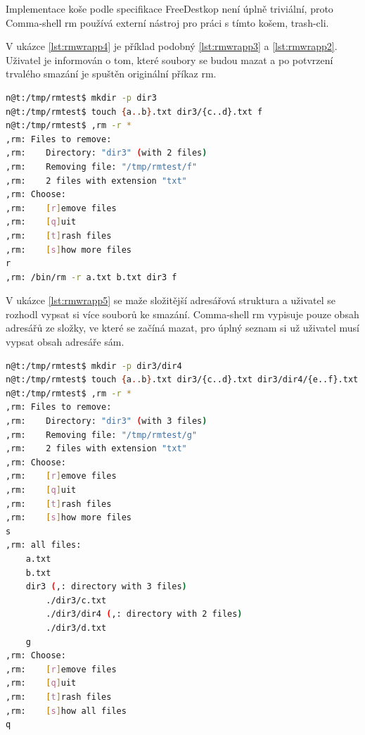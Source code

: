 \documentclass[thesis=M,czech]{FITthesis}[2012/06/26]
\begin{document}
Implementace koše podle specifikace FreeDestkop není úplně triviální, proto Comma-shell rm používá externí nástroj pro práci s tímto košem, trash-cli.


V ukázce \ref{lst:rmwrapp4} je příklad podobný \ref{lst:rmwrapp3} a \ref{lst:rmwrapp2}. Uživatel je informován o tom, které soubory se budou mazat a po potvrzení trvalého smazání je spuštěn originální příkaz rm.

\begin{minipage}{\linewidth}
\begin{lstlisting}[language=bash, caption={rm s }, label={lst:rmwrapp4}]
n@t:/tmp/rmtest$ mkdir -p dir3
n@t:/tmp/rmtest$ touch {a..b}.txt dir3/{c..d}.txt f
n@t:/tmp/rmtest$ ,rm -r *
,rm: Files to remove:
,rm:    Directory: "dir3" (with 2 files)
,rm:    Removing file: "/tmp/rmtest/f"
,rm:    2 files with extension "txt"
,rm: Choose:
,rm:    [r]emove files
,rm:    [q]uit
,rm:    [t]rash files
,rm:    [s]how more files
r
,rm: /bin/rm -r a.txt b.txt dir3 f
\end{lstlisting}
\end{minipage}


V ukázce \ref{lst:rmwrapp5} se maže složitější adresářová struktura a uživatel se rozhodl vypsat si více souborů ke smazání. Comma-shell rm vypisuje pouze obsah adresářů ze složky, ve které se začíná mazat, pro úplný seznam si už uživatel musí vypsat obsah adresáře sám.

\begin{minipage}{\linewidth}
\begin{lstlisting}[language=bash, caption={rm s }, label={lst:rmwrapp5}]
n@t:/tmp/rmtest$ mkdir -p dir3/dir4
n@t:/tmp/rmtest$ touch {a..b}.txt dir3/{c..d}.txt dir3/dir4/{e..f}.txt g
n@t:/tmp/rmtest$ ,rm -r *
,rm: Files to remove:
,rm:    Directory: "dir3" (with 3 files)
,rm:    Removing file: "/tmp/rmtest/g"
,rm:    2 files with extension "txt"
,rm: Choose:
,rm:    [r]emove files
,rm:    [q]uit
,rm:    [t]rash files
,rm:    [s]how more files
s
,rm: all files:
    a.txt
    b.txt
    dir3 (,: directory with 3 files)
        ./dir3/c.txt
        ./dir3/dir4 (,: directory with 2 files)
        ./dir3/d.txt
    g
,rm: Choose:
,rm:    [r]emove files
,rm:    [q]uit
,rm:    [t]rash files
,rm:    [s]how all files
q
\end{lstlisting}
\end{minipage}
\end{document}
